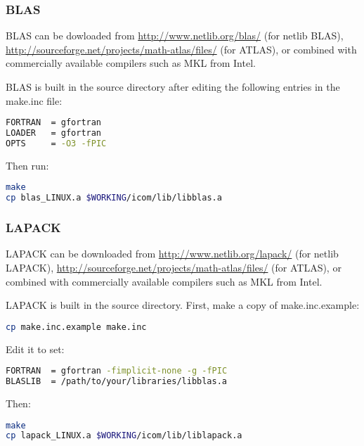 \subsubsection{BLAS}
\label{sec:required_libraries_numerical_blas}

BLAS can be dowloaded from \url{http://www.netlib.org/blas/} (for netlib BLAS),
\url{http://sourceforge.net/projects/math-atlas/files/} (for ATLAS), or
combined with commercially available compilers such as MKL from Intel.

BLAS is built in the source directory after editing the following entries in
the make.inc file:

\begin{lstlisting}[language=bash]
FORTRAN  = gfortran
LOADER   = gfortran
OPTS     = -O3 -fPIC
\end{lstlisting}

Then run:

\begin{lstlisting}[language=bash]
make
cp blas_LINUX.a $WORKING/icom/lib/libblas.a
\end{lstlisting}

\subsubsection{LAPACK}
\label{sec:required_libraries_numerical_lapack}

LAPACK can be downloaded from \url{http://www.netlib.org/lapack/} (for netlib
LAPACK), \url{http://sourceforge.net/projects/math-atlas/files/} (for ATLAS),
or combined with commercially available compilers such as MKL from Intel. 

LAPACK is built in the source directory. First, make a copy of
make.inc.example:

\begin{lstlisting}[language=bash]
cp make.inc.example make.inc
\end{lstlisting}

Edit it to set:

\begin{lstlisting}[language=bash]
FORTRAN  = gfortran -fimplicit-none -g -fPIC
BLASLIB  = /path/to/your/libraries/libblas.a
\end{lstlisting}

Then:

\begin{lstlisting}[language=bash]
make
cp lapack_LINUX.a $WORKING/icom/lib/liblapack.a
\end{lstlisting}

